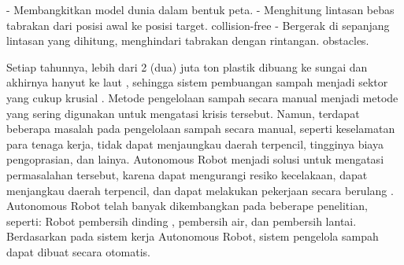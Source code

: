  
- Membangkitkan model dunia dalam bentuk peta.
- Menghitung lintasan bebas tabrakan dari posisi awal ke posisi target. collision-free 
- Bergerak di sepanjang lintasan yang dihitung, menghindari tabrakan dengan rintangan. obstacles.
\cite{Rubio2019a}
 
 
 
 
 
 
 
 Setiap tahunnya, lebih dari 2 (dua) juta ton plastik dibuang ke sungai dan akhirnya hanyut ke laut \cite{Othman2020}, sehingga sistem pembuangan sampah menjadi sektor yang cukup krusial \cite{Othman2020}\cite{Hossain2019}. Metode pengelolaan sampah secara manual menjadi metode yang sering digunakan untuk mengatasi krisis tersebut\cite{Khan2020}. Namun, terdapat beberapa masalah pada pengelolaan sampah secara manual, seperti keselamatan para tenaga kerja, tidak dapat menjaungkau daerah terpencil, tingginya biaya pengoprasian, dan lainya\cite{Khan2020}. Autonomous Robot menjadi solusi untuk mengatasi permasalahan tersebut, karena dapat mengurangi resiko kecelakaan, dapat menjangkau daerah terpencil, dan dapat melakukan pekerjaan secara berulang \cite{Khan2020, Bai2018}. Autonomous Robot telah banyak dikembangkan pada beberape penelitian, seperti: Robot pembersih dinding \cite{HouxiangZhang2006}, pembersih air\cite{Yuan2011}, dan pembersih lantai\cite{Bai2018, Kang2014, Palacin2004}. Berdasarkan pada sistem kerja Autonomous Robot, sistem pengelola sampah dapat dibuat secara otomatis\cite{Bai2018, Nagayo2019, Prasetyo2020}.
 
